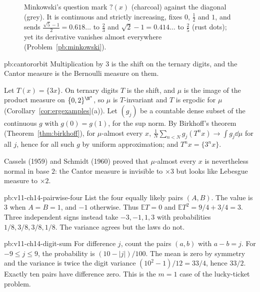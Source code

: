 \begin{figure}[ht]
\centering
{}
\caption{Minkowski's question mark $?(x)$ (charcoal) against the diagonal (grey). It is continuous and strictly increasing, fixes $0$, $\frac12$ and $1$, and sends
$\frac{\sqrt5-1}2=0.618\ldots$ to $\frac23$ and $\sqrt2-1=0.414\ldots$ to $\frac25$ (rust dots); yet its derivative vanishes almost everywhere
(Problem~\ref{pb:minkowski}).}\label{fig:minkowski}
\end{figure}

\begin{solution}{pb:cantororbit}
\idea Multiplication by $3$ is the shift on the ternary digits, and the Cantor measure is the Bernoulli measure on them.

\writeup Let $T(x)=\{3x\}$. On ternary digits $T$ is the shift, and $\mu$ is the image of the product measure on $\{0,2\}^{\N^*}$, so $\mu$ is $T$-invariant and $T$ is
ergodic for $\mu$ (Corollary~\ref{cor:ergexamples}(a)). Let $(g_j)$ be a countable dense subset of the continuous $g$ with $g(0)=g(1)$, for the sup norm. By Birkhoff's theorem
(Theorem~\ref{thm:birkhoff}), for $\mu$-almost every $x$, $\frac1N\sum_{n<N}g_j(T^nx)\to\int g_j\dd\mu$ for all $j$, hence for all such $g$ by uniform approximation; and $T^nx=\{3^nx\}$.

\leads Cassels (1959) and Schmidt (1960) proved that $\mu$-almost every $x$ is nevertheless normal in base $2$: the Cantor measure is invisible to $\times3$ but
looks like Lebesgue measure to $\times2$.
\end{solution}

\begin{solution}{pb:v11-ch14-pairwise-four}
\idea List the four equally likely pairs $(A,B)$.
\writeup The value is $3$ when $A=B=1$, and $-1$ otherwise. Thus $\mathbb ET=0$ and $\mathbb ET^2=9/4+3/4=3$. Three independent signs instead take $-3,-1,1,3$ with probabilities $1/8,3/8,3/8,1/8$. The variance agrees but the laws do not.
\end{solution}

\begin{solution}{pb:v11-ch14-digit-sum}
\idea For difference $j$, count the pairs $(a,b)$ with $a-b=j$.
\writeup For $-9\le j\le9$, the probability is $(10-|j|)/100$. The mean is zero by symmetry and the variance is twice the digit variance $(10^2-1)/12=33/4$, hence $33/2$. Exactly ten pairs have difference zero. This is the $m=1$ case of the lucky-ticket problem.
\end{solution}


